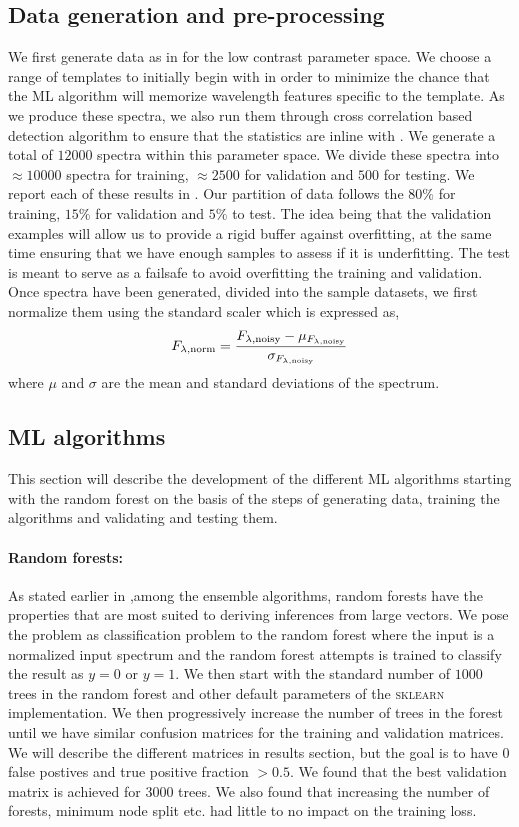 \subsection{Data generation and pre-processing}
We first generate data as in  for the low contrast parameter space.
We choose a range of templates to initially begin with in order to minimize the chance that the ML algorithm will memorize wavelength features specific to the template.
As we produce these spectra, we also run them through cross correlation based detection algorithm to ensure that the statistics are inline with .
We generate a total of $12000$ spectra within this parameter space. 
We divide these spectra into $\approx10000$ spectra for training, $\approx 2500$ for validation and $500$ for testing.
We report each of these results in .
Our partition of data follows the $80\%$ for training, $15\%$ for validation and $5\%$ to test.
The idea being that the validation examples will allow us to provide a rigid buffer against overfitting, at the same time ensuring that we have enough samples to assess if it is underfitting.
The test is meant to serve as a failsafe to avoid overfitting the training and validation.
Once spectra have been generated, divided into the sample datasets, we first normalize them using the standard scaler which is expressed as,
\begin{equation}
    F_{\lambda,\rm{norm}} = \dfrac{F_{\lambda,\rm{noisy}}-\mu_{F_{\lambda,\rm{noisy}}}}{\sigma_{F_{\lambda,\rm{noisy}}}}
\end{equation}
where $\mu$ and $\sigma$ are the mean and standard deviations of the spectrum. 
\subsection{ML algorithms}
This section will describe the development of the different ML algorithms starting with the random forest on the basis of the steps of generating data, training the algorithms and validating and testing them.
\paragraph{Random forests:\\}
As stated earlier in ,among the ensemble algorithms, random forests have the properties that are most suited to deriving inferences from large vectors.
We pose the problem as classification problem to the random forest where the input is a normalized input spectrum and the random forest attempts is trained to classify the result as $y=0$ or $y=1$.
We then start with the standard number of $1000$ trees in the random forest and other default parameters of the \textsc{sklearn} implementation.
We then progressively increase the number of trees in the forest until we have similar confusion matrices for the training and validation matrices.
We will describe the different matrices in results section, but the goal is to have $0$ false postives and true positive fraction $>0.5$.
We found that the best validation matrix is achieved for $3000$ trees.
We also found that increasing the number of forests, minimum node split etc. had little to no impact on the training loss. 
